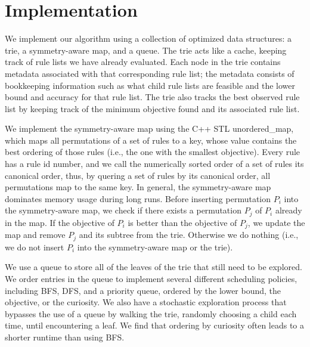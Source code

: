 \section{Implementation}
\label{sec:implementation}



We implement our algorithm using a collection of optimized data structures:
a trie, a symmetry-aware map, and a queue.
The trie acts like a cache, keeping track of rule lists we have already evaluated.
Each node in the trie contains metadata associated with that corresponding rule list;
the metadata consists of bookkeeping information such as what child rule lists are feasible and
the lower bound and accuracy for that rule list.
The trie also tracks the best observed rule list by keeping track of the minimum objective
found and its associated rule list.

We implement the symmetry-aware map using the C++ STL unordered\_map, which
maps all permutations of a set of rules to a key, whose value
contains the best ordering of those rules (i.e., the one with the smallest objective).
Every rule has a rule id number, and we call the numerically sorted order of a set of rules its
canonical order, thus, by quering a set of rules by its canonical order, all
permutations map to the same key.
%
%
In general, the symmetry-aware map dominates memory usage during long runs.
Before inserting permutation $P_i$ into the symmetry-aware map, we check
if there exists a permutation $P_j$ of $P_i$ already in the map.
If the objective of $P_i$ is better than the objective of $P_j$,
we update the map and remove $P_j$ and its subtree from the trie.
Otherwise we do nothing (i.e., we do not insert $P_i$ into the symmetry-aware map
or the trie).

We use a queue to store all of the leaves of the trie that still need to be explored.
We order entries in the queue to implement several different scheduling policies,
including BFS, DFS, and a priority queue, ordered by the lower bound, the objective, or the
curiosity.
We also have a stochastic exploration process that bypasses the use of a queue by walking
the trie, randomly choosing a child each time, until encountering a leaf.
We find that ordering by curiosity often leads to a shorter runtime than using BFS.

